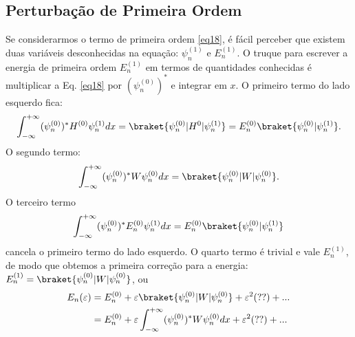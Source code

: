 \documentclass{article}
\begin{document}
\subsection{Perturbação de Primeira Ordem}

Se considerarmos o termo de primeira ordem \eqref{eq18}, é fácil perceber que existem duas variáveis desconhecidas na equação: $\psi_n^{(1)}$ e $E_n^{(1)}$. O truque para escrever a energia de primeira ordem $E_n^{(1)}$ em termos de quantidades conhecidas é multiplicar a Eq. \eqref{eq18} por $(\psi_n^{(0)})^{*}$ e integrar em $x$. O primeiro termo do lado esquerdo fica:
\begin{equation}
    \int_{-\infty}^{+\infty}(\psi_n^{(0)})^{*}H^{(0)}\psi_n^{(1)}dx = \braket{\psi_n^{(0)}|H^0|\psi_n^{(1)}} = E_n^{(0)}\braket{\psi_n^{(0)}|\psi_n^{(1)}}.
\end{equation}
O segundo termo:
\begin{equation}
    \int_{-\infty}^{+\infty}(\psi_n^{(0)})^{*}W\psi_n^{(0)}dx = \braket{\psi_n^{(0)}|W|\psi_n^{(0)}}.
\end{equation}
O terceiro termo
\begin{equation}
    \int_{-\infty}^{+\infty}(\psi_n^{(0)})^{*}E_n^{(0)}\psi_n^{(1)}dx = E_n^{(0)}\braket{\psi_n^{(0)}|\psi_n^{(1)}}
\end{equation}
cancela o primeiro termo do lado esquerdo. O quarto termo é trivial e vale $E_n^{(1)}$, de modo que obtemos a primeira correção para a energia: $E_n^{(1)} = \braket{\psi_n^{(0)}|W|\psi_n^{(0)}}$, ou
\begin{equation}
\begin{split}
    E_n(\varepsilon) &= E_n^{(0)} + \varepsilon\braket{\psi_n^{(0)}|W|\psi_n^{(0)}} + \varepsilon^2 (??) + ... \\
                     &= E_n^{(0)} + \varepsilon\int_{-\infty}^{+\infty}(\psi_n^{(0)})^{*}W\psi_n^{(0)}dx + \varepsilon^2 (??) + ...
\end{split}
\end{equation}
\end{document}
